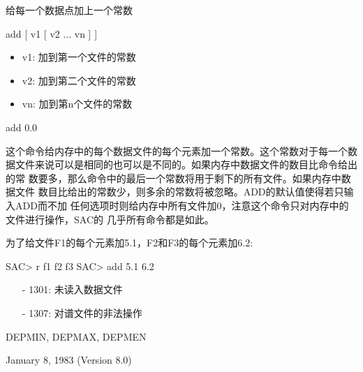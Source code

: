 \label{cmd:add}

给每一个数据点加上一个常数

\begin{SACSyntax}
add [ v1 [ v2 ... vn ] ]
\end{SACSyntax}

\begin{itemize}
\item v1:  加到第一个文件的常数
\item v2:  加到第二个文件的常数
\item vn:  加到第n个文件的常数
\end{itemize}

add 0.0

这个命令给内存中的每个数据文件的每个元素加一个常数。这个常数对于每一个数
据文件来说可以是相同的也可以是不同的。如果内存中数据文件的数目比命令给出的常
数要多，那么命令中的最后一个常数将用于剩下的所有文件。如果内存中数据文件
数目比给出的常数少，则多余的常数将被忽略。ADD的默认值使得若只输入ADD而不加
任何选项时则给内存中所有文件加0，注意这个命令只对内存中的文件进行操作，SAC的
几乎所有命令都是如此。


为了给文件F1的每个元素加5.1，F2和F3的每个元素加6.2:
\begin{SACCode}
SAC> r f1 f2 f3
SAC> add 5.1 6.2
\end{SACCode}

\begin{itemize}
\item[-]1301: 未读入数据文件
\item[-]1307: 对谱文件的非法操作
\end{itemize}

DEPMIN, DEPMAX, DEPMEN

January 8, 1983 (Version 8.0)
